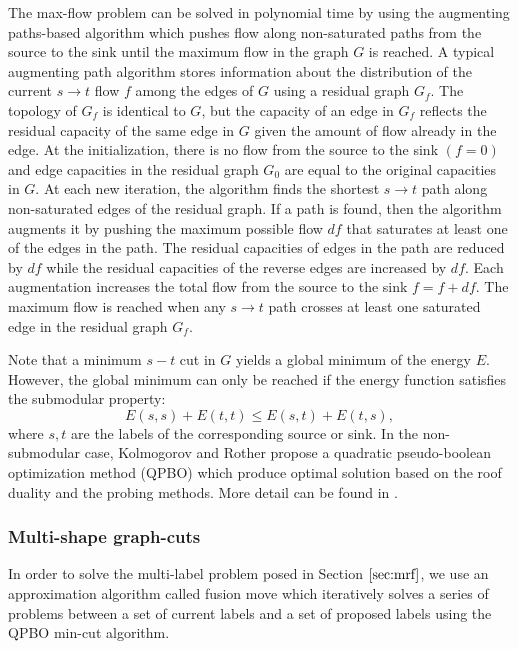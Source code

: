 \documentclass{SMBV12}
\begin{document}
The max-flow problem can be solved in polynomial time by using the augmenting paths-based algorithm which pushes flow along non-saturated paths from the source to the sink until the maximum flow in the graph $G$ is reached. A typical augmenting path algorithm stores information about the distribution of the current $s \rightarrow t$ flow $f$ among the edges of $G$ using a residual graph $G_f$. The topology of $G_f$ is identical to $G$, but the capacity of an edge in $G_f$ reflects the residual capacity of the same edge in $G$ given the amount of flow already in the edge. At the initialization, there is no flow from the source to the sink $(f = 0)$ and edge capacities in the residual graph $G_0$ are equal to the original capacities in $G$. At each new
iteration, the algorithm finds the shortest $s \rightarrow t$ path along non-saturated edges of the residual graph. If a path is found, then the algorithm augments it by pushing the maximum possible flow $df$ that saturates at least one of the edges in the path. The residual capacities of edges in the path are reduced
by $df$ while the residual capacities of the reverse edges are increased by $df$. Each augmentation increases the total flow from the source to the sink $f = f + df$. The maximum flow is reached when any $s \rightarrow t$ path crosses at least one saturated edge in the residual graph $G_f$.

Note that a minimum $s-t$ cut in $G$ yields a global minimum of the energy $E$. However, the global minimum can only be reached if the energy function satisfies the submodular property:
\begin{equation}
E(s, s) + E(t,t) \leq E(s,t) + E(t, s),
\end{equation}
where $s, t$ are the labels of the corresponding source or sink. In the non-submodular case, Kolmogorov and Rother propose a quadratic pseudo-boolean optimization method (QPBO) which produce optimal solution based on the roof duality and the probing methods. More detail can be found in \cite{kolmogorov2007minimizing}.

\subsubsection{Multi-shape graph-cuts}

In order to solve the multi-label problem posed in Section $\ref{sec:mrf}$, we use an approximation algorithm called fusion move \cite{lempitsky2010fusion} which iteratively solves a series of problems between a set of current labels and a set of proposed labels using the QPBO min-cut algorithm.
\end{document}
